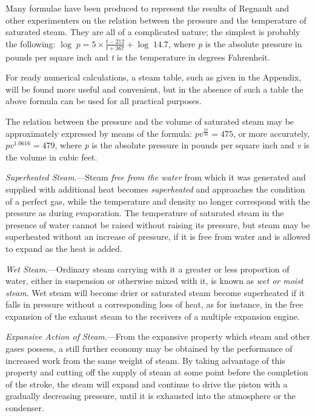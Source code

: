 \documentclass[11pt, a5paper]{book}
\begin{document}
Many formulae have been produced to represent the results of Regnault
and other experimenters on the relation between the pressure and the
temperature of saturated steam.  They are all of a complicated nature;
the simplest is probably the following:
$\log\; p=5\times\frac{t-212}{t+367}+\log\; 14.7$,
where \textit{p} is the
absolute pressure in pounds per square inch and \textit{t} is the
temperature in degrees Fahrenheit.\par

For ready numerical calculations, a steam table, such as given in the
Appendix, will be found more useful and convenient, but in the absence
of such a table the above formula can be used for all practical
purposes.\par

The relation between the pressure and the volume of saturated steam
may be approximately expressed by means of the formula:
$pv^\frac{17}{16} = 475$, or more accurately, $pv^1.0616 = 479$, where
\textit{p} is the absolute pressure in pounds per square inch and
\textit{v} is the volume in cubic feet.\par

\textit{Superheated Steam}.---Steam \textit{free from the water} from
which it was generated and supplied with additional heat becomes
\textit{superheated} and approaches the condition of a perfect gas,
while the temperature and density no longer correspond with the
pressure as during evaporation.  The temperature of saturated steam in
the presence of water cannot be raised without raising its pressure,
but steam may be superheated without an increase of pressure, if it is
free from water and is allowed to expand as the heat is added.\par

\textit{Wet Steam}.---Ordinary steam carrying with it a greater or
less proportion of water, either in suspension or otherwise mixed with
it, is known as \textit{wet or moist steam}.  Wet steam will become
drier or saturated steam become superheated if it falls in pressure
without a corresponding loss of heat, as for instance, in the free
expansion of the exhaust steam to the receivers of a multiple
expansion engine.\par

\textit{Expansive Action of Steam}.---From the expansive property
which steam and other gases possess, a still further economy may be
obtained by the performance of increased work from the same weight
of steam.  By taking advantage of this property and cutting off the
supply of steam at some point before the completion of the stroke, the
steam will expand and continue to drive the piston with a gradually
decreasing pressure, until it is exhausted into the atmosphere or the
condenser.\par
\end{document}

